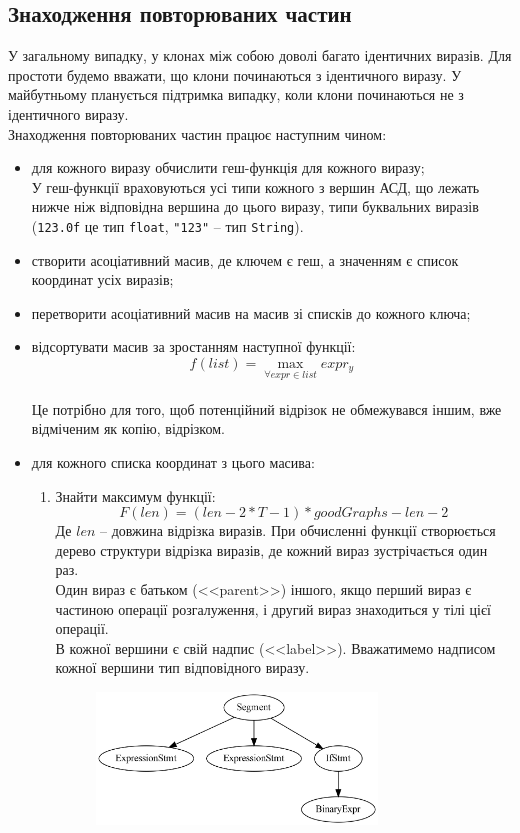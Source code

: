 \documentclass[a4paper, 14pt]{article}
\begin{document}
\subsection{Знаходження повторюваних частин}
У загальному випадку, у клонах між собою доволі багато ідентичних виразів. Для простоти будемо вважати, що клони починаються з ідентичного виразу. У майбутньому планується підтримка випадку, коли клони починаються не з ідентичного виразу. \\
Знаходження повторюваних частин працює наступним чином:
\begin{itemize}
\item для кожного виразу обчислити геш-функція для кожного виразу;\\
У геш-функції враховуються усі типи кожного з вершин АСД, що лежать нижче ніж відповідна вершина до цього виразу, типи буквальних виразів (\verb|123.0f| це тип \verb|float|, \verb|"123"| -- тип \verb|String|).
\item{створити асоціативний масив, де ключем є геш, а значенням є список координат усіх виразів;}
\item{перетворити асоціативний масив на масив зі списків до кожного ключа;}
\item{відсортувати масив за зростанням наступної функції: $$f(list)=\max_{\forall expr \in list}{expr_{y}} $$ \\
Це потрібно для того, щоб потенційний відрізок не обмежувався іншим, вже відміченим як копію, відрізком.}
\item{для кожного списка координат з цього масива: 
\begin{enumerate}
\item{Знайти максимум функції: $$F(len)=(len-2*T-1)*goodGraphs-len-2$$
Де $len$ -- довжина відрізка виразів. При обчисленні функції створюється дерево структури відрізка виразів, де кожний вираз зустрічається один раз. \\
Один вираз є батьком (<<parent>>) іншого, якщо перший вираз є частиною операції розгалуження, і другий вираз знаходиться у тілі цієї операції. \\
В кожної вершини є свій надпис (<<label>>). Вважатимемо надписом кожної вершини тип відповідного виразу. \\
\begin{figure}[h]
    \centering
    \includegraphics[width=0.75\textwidth]{function_graph_example}

\end{figure}}
\end{enumerate}}
\end{itemize}
\end{document}
